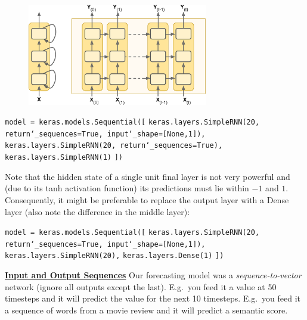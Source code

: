 \begin{figure}[ht]
\centering
\includegraphics[width=0.70\textwidth]{./images/deep_RNN.png}
\end{figure}

\vspace{+2.0mm}
\texttt{model = keras.models.Sequential([}\newline
\texttt{keras.layers.SimpleRNN(20, return\char`_sequences=True, input\char`_shape=[None,1]),}\newline
\texttt{keras.layers.SimpleRNN(20, return\char`_sequences=True),}\newline
\texttt{keras.layers.SimpleRNN(1)}\newline
\texttt{])}

Note that the hidden state of a single unit final layer is not very powerful
and (due to its tanh activation function) its predictions must lie within $-1$ and $1$. 
Consequently, it might be preferable to replace the output layer with a Dense layer
(also note the difference in the middle layer):

\texttt{model = keras.models.Sequential([}\newline
\texttt{keras.layers.SimpleRNN(20, return\char`_sequences=True, input\char`_shape=[None,1]),}\newline
\texttt{keras.layers.SimpleRNN(20),}\newline
\texttt{keras.layers.Dense(1)}\newline
\texttt{])}\newline

\textbf{\underline{Input and Output Sequences}}\newline
Our forecasting model was a \textit{sequence-to-vector} network (ignore all outputs except the last).
% 
E.g.~you feed it a value at 50 timesteps and it will predict the value for the next 10 timesteps.\newline
E.g.~you feed it a sequence of words from a movie review and it will predict a semantic score.

